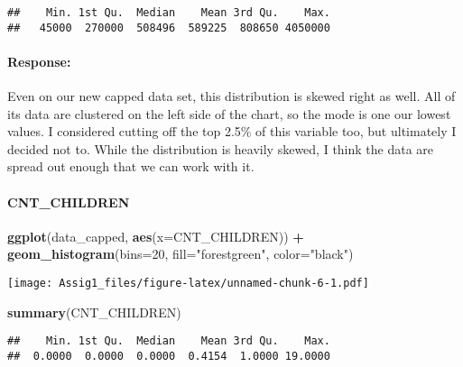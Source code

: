 \documentclass[
]{article}
\newenvironment{Shaded}{\begin{snugshade}}{\end{snugshade}}
\newcommand{\AttributeTok}[1]{\textcolor[rgb]{0.13,0.29,0.53}{#1}}
\newcommand{\DecValTok}[1]{\textcolor[rgb]{0.00,0.00,0.81}{#1}}
\newcommand{\FunctionTok}[1]{\textcolor[rgb]{0.13,0.29,0.53}{\textbf{#1}}}
\newcommand{\NormalTok}[1]{#1}
\newcommand{\SpecialCharTok}[1]{\textcolor[rgb]{0.81,0.36,0.00}{\textbf{#1}}}
\newcommand{\StringTok}[1]{\textcolor[rgb]{0.31,0.60,0.02}{#1}}
\begin{document}
\begin{verbatim}
##    Min. 1st Qu.  Median    Mean 3rd Qu.    Max. 
##   45000  270000  508496  589225  808650 4050000
\end{verbatim}

\hypertarget{response}{%
\paragraph{Response:}\label{response}}

Even on our new capped data set, this distribution is skewed right as
well. All of its data are clustered on the left side of the chart, so
the mode is one our lowest values. I considered cutting off the top
2.5\% of this variable too, but ultimately I decided not to. While the
distribution is heavily skewed, I think the data are spread out enough
that we can work with it.

\hypertarget{cnt_children}{%
\paragraph{CNT\_CHILDREN}\label{cnt_children}}

\begin{Shaded}
\begin{Highlighting}[]
\FunctionTok{ggplot}\NormalTok{(data\_capped, }\FunctionTok{aes}\NormalTok{(}\AttributeTok{x=}\NormalTok{CNT\_CHILDREN)) }\SpecialCharTok{+}
  \FunctionTok{geom\_histogram}\NormalTok{(}\AttributeTok{bins=}\DecValTok{20}\NormalTok{, }\AttributeTok{fill=}\StringTok{"forestgreen"}\NormalTok{, }\AttributeTok{color=}\StringTok{"black"}\NormalTok{)}
\end{Highlighting}
\end{Shaded}

\texttt{[image: Assig1\_files/figure-latex/unnamed-chunk-6-1.pdf]}

\begin{Shaded}
\begin{Highlighting}[]
\FunctionTok{summary}\NormalTok{(CNT\_CHILDREN)}
\end{Highlighting}
\end{Shaded}

\begin{verbatim}
##    Min. 1st Qu.  Median    Mean 3rd Qu.    Max. 
##  0.0000  0.0000  0.0000  0.4154  1.0000 19.0000
\end{verbatim}
\end{document}
